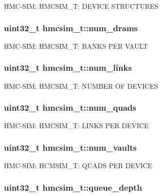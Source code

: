 H\-M\-C-\/\-S\-I\-M\-: H\-M\-C\-S\-I\-M\-\_\-\-T\-: D\-E\-V\-I\-C\-E S\-T\-R\-U\-C\-T\-U\-R\-E\-S \hypertarget{structhmcsim__t_a8243c603f7ab323024fd6342c6f856de}{
\subsubsection[{num\-\_\-drams}]{\setlength{\rightskip}{0pt plus 5cm}uint32\-\_\-t hmcsim\-\_\-t\-::num\-\_\-drams}}\label{structhmcsim__t_a8243c603f7ab323024fd6342c6f856de}
H\-M\-C-\/\-S\-I\-M\-: H\-M\-C\-S\-I\-M\-\_\-\-T\-: B\-A\-N\-K\-S P\-E\-R V\-A\-U\-L\-T \hypertarget{structhmcsim__t_ad248f0930675a283bdcf821a68703dc3}{
\subsubsection[{num\-\_\-links}]{\setlength{\rightskip}{0pt plus 5cm}uint32\-\_\-t hmcsim\-\_\-t\-::num\-\_\-links}}\label{structhmcsim__t_ad248f0930675a283bdcf821a68703dc3}
H\-M\-C-\/\-S\-I\-M\-: H\-M\-C\-S\-I\-M\-\_\-\-T\-: N\-U\-M\-B\-E\-R O\-F D\-E\-V\-I\-C\-E\-S \hypertarget{structhmcsim__t_a39422582c1c7e0a3b0787b5209887329}{
\subsubsection[{num\-\_\-quads}]{\setlength{\rightskip}{0pt plus 5cm}uint32\-\_\-t hmcsim\-\_\-t\-::num\-\_\-quads}}\label{structhmcsim__t_a39422582c1c7e0a3b0787b5209887329}
H\-M\-C-\/\-S\-I\-M\-: H\-M\-C\-S\-I\-M\-\_\-\-T\-: L\-I\-N\-K\-S P\-E\-R D\-E\-V\-I\-C\-E \hypertarget{structhmcsim__t_a66fb8d5d598a7fbceefaad3dd96ec6e0}{
\subsubsection[{num\-\_\-vaults}]{\setlength{\rightskip}{0pt plus 5cm}uint32\-\_\-t hmcsim\-\_\-t\-::num\-\_\-vaults}}\label{structhmcsim__t_a66fb8d5d598a7fbceefaad3dd96ec6e0}
H\-M\-C-\/\-S\-I\-M\-: H\-C\-M\-S\-I\-M\-\_\-\-T\-: Q\-U\-A\-D\-S P\-E\-R D\-E\-V\-I\-C\-E \hypertarget{structhmcsim__t_a30a69481d824b545c762af1a870a9ec1}{
\subsubsection[{queue\-\_\-depth}]{\setlength{\rightskip}{0pt plus 5cm}uint32\-\_\-t hmcsim\-\_\-t\-::queue\-\_\-depth}}\label{structhmcsim__t_a30a69481d824b545c762af1a870a9ec1}
